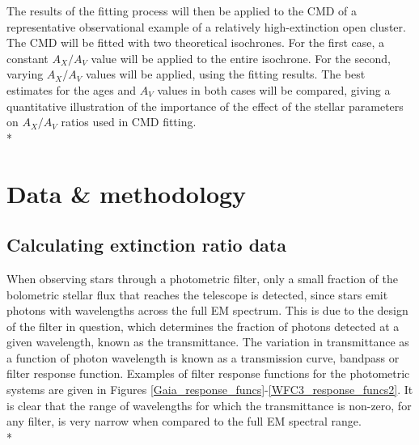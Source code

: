 \documentclass[12pt, a4paper]{report}
\begin{document}


The results of the fitting process will then be applied to the CMD of a representative observational example of a relatively high-extinction open cluster. The CMD will be fitted with two theoretical isochrones. For the first case, a constant $A_{X}/A_{V}$ value will be applied to the entire isochrone. For the second, varying $A_{X}/A_{V}$ values will be applied, using the fitting results. The best estimates for the ages and $A_{V}$ values in both cases will be compared, giving a quantitative illustration of the importance of the effect of the stellar parameters on $A_{X}/A_{V}$ ratios used in CMD fitting.\\*



\chapter{Data \& methodology}

\section{Calculating extinction ratio data}

When observing stars through a photometric filter, only a small fraction of the bolometric stellar flux that reaches the telescope is detected, since stars emit photons with wavelengths across the full EM spectrum. This is due to the design of the filter in question, which determines the fraction of photons detected at a given wavelength, known as the transmittance. The variation in transmittance as a function of photon wavelength is known as a transmission curve, bandpass or filter response function. Examples of filter response functions for the photometric systems are given in Figures \ref{Gaia_response_funcs}-\ref{WFC3_response_funcs2}. It is clear that the range of wavelengths for which the transmittance is non-zero, for any filter, is very narrow when compared to the full EM spectral range.\\* 
\end{document}
